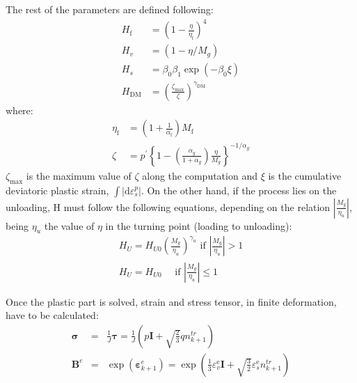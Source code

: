 \documentclass[preprint,12pt,a4paper]{elsarticle}
\begin{document}
The rest of the parameters are defined following:
\begin{equation}
\begin{aligned} H_{\mathrm{f}} &=\left(1-\frac{\eta}{\eta_{\mathrm{f}}}\right)^{4} \\ 
H_{v} &=\left(1-\eta / M_{g}\right) \\ 
H_{s} &=\beta_{0} \beta_{1} \exp \left(-\beta_{0} \xi\right) \\ 
H_{\mathrm{DM}} &=\left(\frac{\zeta_{\mathrm{max}}}{\zeta}\right)^{\gamma_{\mathrm{DM}}} \end{aligned}
\end{equation}
where:
\begin{equation}
\begin{aligned} 
\eta_{\mathrm{f}} &=\left(1+\frac{1}{\alpha_{\mathrm{f}}}\right) M_{\mathrm{f}} \\ 
\zeta &=p^{\prime}\left\{1-\left(\frac{\alpha_{g}}{1+\alpha_{g}}\right) \frac{\eta}{M_{g}}\right\}^{-1 / \alpha_{g}} \end{aligned}
\end{equation}
$\zeta_{\mathrm{max}}$ is the maximum value of $\zeta$ along the computation and $\xi$ is the cumulative deviatoric plastic strain, $\int\left|\mathrm{d} \varepsilon_{s}^{p}\right| $. On the other hand, if the process lies on the unloading, H must follow the following equations, depending on the relation $\left|\frac{M_{g}}{\eta_{u}}\right|$, being $\eta_{u}$ the value of $\eta$ in the turning point (loading to unloading):
\begin{equation}
\begin{array}{c}{H_{U}=H_{U 0}\left(\frac{M_{g}}{\eta_{u}}\right)^{\gamma_{u}} \text { if }\left|\frac{M_{g}}{\eta_{u}}\right|>1} \\ 
{H_{U}=H_{U 0} \quad \text { if }\left|\frac{M_{g}}{\eta_{u}}\right| \leqslant 1}\end{array}
\end{equation}

Once the plastic part is solved, strain and stress tensor, in finite deformation, have to be calculated:
\begin{eqnarray}
    \boldsymbol{\sigma} &=& \frac{1}{J}\boldsymbol{\tau}=\frac{1}{J}\left(p\boldsymbol{I}+ \sqrt{\frac{2}{3}}q{n}^{tr}_{k+1}\right) \\
    \boldsymbol{B}^e &=& \exp (\boldsymbol{\varepsilon}_{k+1}^{e})=\exp\left(\frac{1}{3}\varepsilon_{v}^{\mathrm{e}}\boldsymbol{I} + \sqrt{\frac{3}{2}}\varepsilon_{s}^{\mathrm{e}}{n}^{tr}_{k+1}\right)
\end{eqnarray}
\end{document}
